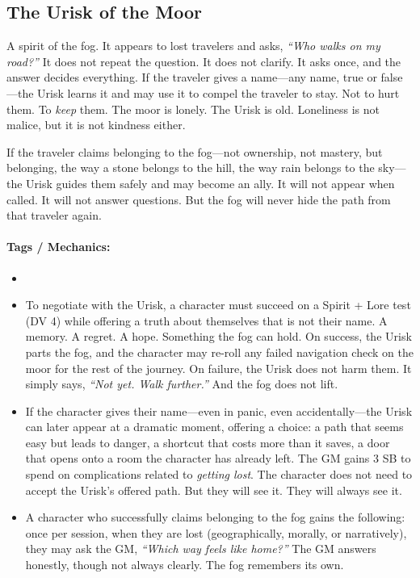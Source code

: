 \subsection*{The Urisk of the Moor}

A spirit of the fog. It appears to lost travelers and asks, \textit{``Who walks on my road?''} It does not repeat the question. It does not clarify. It asks once, and the answer decides everything. If the traveler gives a name---any name, true or false---the Urisk learns it and may use it to compel the traveler to stay. Not to hurt them. To \textit{keep} them. The moor is lonely. The Urisk is old. Loneliness is not malice, but it is not kindness either.

If the traveler claims belonging to the fog---not ownership, not mastery, but belonging, the way a stone belongs to the hill, the way rain belongs to the sky---the Urisk guides them safely and may become an ally. It will not appear when called. It will not answer questions. But the fog will never hide the path from that traveler again.

\paragraph{Tags / Mechanics:}
\begin{itemize}
\item [SPIRIT] [THRESHOLD] [TRUTH]
\item To negotiate with the Urisk, a character must succeed on a Spirit + Lore test (DV 4) while offering a truth about themselves that is not their name. A memory. A regret. A hope. Something the fog can hold. On success, the Urisk parts the fog, and the character may re-roll any failed navigation check on the moor for the rest of the journey. On failure, the Urisk does not harm them. It simply says, \textit{``Not yet. Walk further.''} And the fog does not lift.
\item If the character gives their name---even in panic, even accidentally---the Urisk can later appear at a dramatic moment, offering a choice: a path that seems easy but leads to danger, a shortcut that costs more than it saves, a door that opens onto a room the character has already left. The GM gains 3 SB to spend on complications related to \textit{getting lost}. The character does not need to accept the Urisk's offered path. But they will see it. They will always see it.
\item A character who successfully claims belonging to the fog gains the following: once per session, when they are lost (geographically, morally, or narratively), they may ask the GM, \textit{``Which way feels like home?''} The GM answers honestly, though not always clearly. The fog remembers its own.
\end{itemize}

